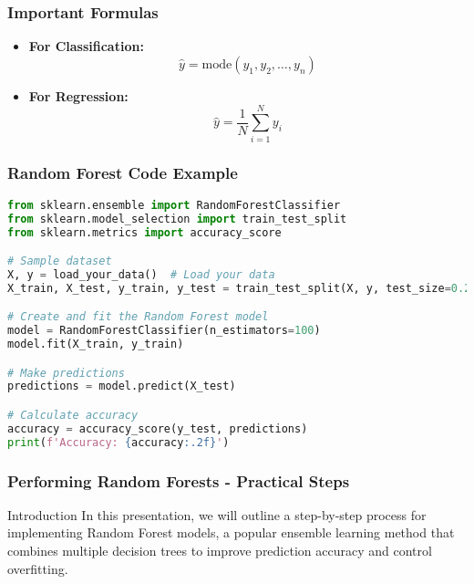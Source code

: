 \documentclass[aspectratio=169]{beamer}
\begin{document}
\begin{frame}[fragile]
  \frametitle{Important Formulas}
  \begin{itemize}
    \item \textbf{For Classification:}
    \begin{equation}
      \hat{y} = \text{mode}(y_1, y_2, \ldots, y_n)
    \end{equation}
    
    \item \textbf{For Regression:}
    \begin{equation}
      \hat{y} = \frac{1}{N} \sum_{i=1}^{N} y_i
    \end{equation}
  \end{itemize}
\end{frame}

\begin{frame}[fragile]
  \frametitle{Random Forest Code Example}
  \begin{lstlisting}[language=Python]
from sklearn.ensemble import RandomForestClassifier
from sklearn.model_selection import train_test_split
from sklearn.metrics import accuracy_score

# Sample dataset
X, y = load_your_data()  # Load your data
X_train, X_test, y_train, y_test = train_test_split(X, y, test_size=0.2, random_state=42)

# Create and fit the Random Forest model
model = RandomForestClassifier(n_estimators=100)
model.fit(X_train, y_train)

# Make predictions
predictions = model.predict(X_test)

# Calculate accuracy
accuracy = accuracy_score(y_test, predictions)
print(f'Accuracy: {accuracy:.2f}')
  \end{lstlisting}
\end{frame}

\begin{frame}[fragile]
    \frametitle{Performing Random Forests - Practical Steps}
    \begin{block}{Introduction}
        In this presentation, we will outline a step-by-step process for implementing Random Forest models, a popular ensemble learning method that combines multiple decision trees to improve prediction accuracy and control overfitting.
    \end{block}
\end{frame}
\end{document}
